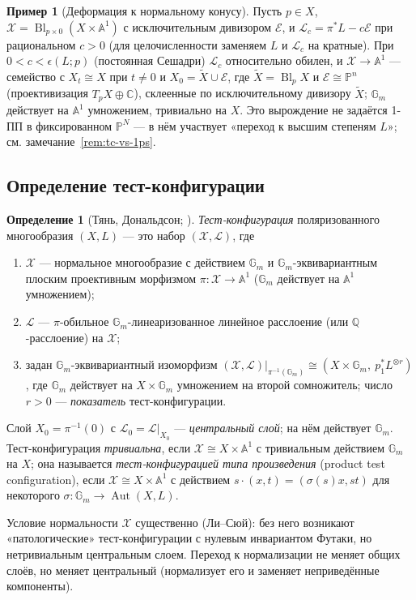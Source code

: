 \documentclass[11pt,a4paper]{article}
\theoremstyle{plain}
\theoremstyle{definition}
\newtheorem{definition}[theorem]{Определение}
\newtheorem{example}[theorem]{Пример}
\theoremstyle{remark}
\renewcommand{\C}{\mathbb{C}}
\newcommand{\Q}{\mathbb{Q}}
\newcommand{\PP}{\mathbb{P}}
\newcommand{\A}{\mathbb{A}}
\newcommand{\Gm}{\mathbb{G}_m}
\newcommand{\cL}{\mathcal{L}}
\newcommand{\cX}{\mathcal{X}}
\DeclareMathOperator{\Bl}{Bl}
\DeclareMathOperator{\Aut}{Aut}
\begin{document}
\begin{example}[Деформация к нормальному конусу]\label{ex:normal-cone}
Пусть $p\in X$, $\cX=\Bl_{p\times0}(X\times\A^1)$ с исключительным дивизором $\mathcal E$, и
$\cL_c=\pi^*L-c\mathcal E$ при рациональном $c>0$ (для целочисленности заменяем $L$ и $\cL_c$ на
кратные). При $0<c<\epsilon(L;p)$ (постоянная Сешадри) $\cL_c$ относительно обилен, и
$\cX\to\A^1$ --- семейство с $X_t\cong X$ при $t\ne0$ и $X_0=\tilde X\cup\mathcal E$, где
$\tilde X=\Bl_pX$ и $\mathcal E\cong\PP^n$ (проективизация $T_pX\oplus\C$), склеенные по
исключительному дивизору $\tilde X$; $\Gm$ действует на $\A^1$ умножением, тривиально на $X$.
Это вырождение не задаётся 1-ПП в фиксированном $\PP^N$ --- в нём участвует «переход к высшим
степеням $L$»; см. замечание~\ref{rem:tc-vs-1ps}.
\end{example}

\subsection{Определение тест-конфигурации}

\begin{definition}[{Тянь, Дональдсон; \cite[2.1]{Xu}}]\label{def:tc}
\emph{Тест-конфигурация} поляризованного многообразия $(X,L)$ --- это набор $(\cX,\cL)$, где
\begin{enumerate}
\item $\cX$ --- нормальное многообразие с действием $\Gm$ и $\Gm$-эквивариантным плоским проективным
морфизмом $\pi\colon\cX\to\A^1$ ($\Gm$ действует на $\A^1$ умножением);
\item $\cL$ --- $\pi$-обильное $\Gm$-линеаризованное линейное расслоение (или $\Q$-расслоение) на
$\cX$;
\item задан $\Gm$-эквивариантный изоморфизм $(\cX,\cL)|_{\pi^{-1}(\Gm)}\cong(X\times\Gm,\ p_1^*L^{\otimes r})$,
где $\Gm$ действует на $X\times\Gm$ умножением на второй сомножитель; число $r>0$ --- \emph{показатель}
тест-конфигурации.
\end{enumerate}
Слой $X_0=\pi^{-1}(0)$ с $\cL_0=\cL|_{X_0}$ --- \emph{центральный слой}; на нём действует $\Gm$.
Тест-конфигурация \emph{тривиальна}, если $\cX\cong X\times\A^1$ с тривиальным действием $\Gm$ на
$X$; она называется \emph{тест-конфигурацией типа произведения} (product test configuration), если $\cX\cong X\times\A^1$ с действием
$s\cdot(x,t)=(\sigma(s)x,st)$ для некоторого $\sigma\colon\Gm\to\Aut(X,L)$.
\end{definition}

Условие нормальности $\cX$ существенно (Ли--Сюй): без него возникают «патологические»
тест-конфигурации с нулевым инвариантом Футаки, но нетривиальным центральным слоем. Переход к
нормализации не меняет общих слоёв, но меняет центральный (нормализует его и
заменяет неприведённые компоненты).
\end{document}
